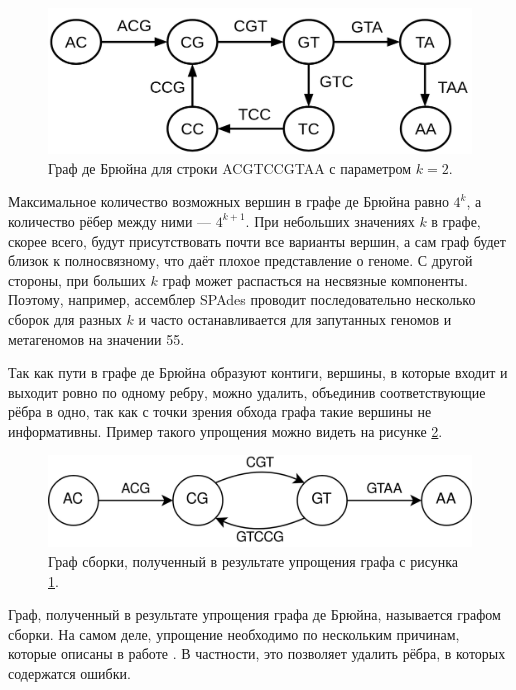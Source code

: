 \documentclass[14pt]{matmex-diploma-custom}
\begin{document}
\begin{figure}[h]
	\centering
	\includegraphics[scale=0.3]{debruijn.png}
	\caption{Граф де Брюйна для строки ACGTCCGTAA с параметром ${k=2}$.}
	\label{fig:debruijn}
\end{figure}

Максимальное количество возможных вершин в графе де Брюйна равно $4^k$, а количество рёбер между ними --- $4^{k+1}$. При небольших значениях $k$ в графе, скорее всего, будут присутствовать почти все варианты вершин, а сам граф будет близок к полносвязному, что даёт плохое представление о геноме. С другой стороны, при больших $k$ граф может распасться на несвязные компоненты. Поэтому, например, ассемблер SPAdes проводит последовательно несколько сборок для разных $k$ и часто останавливается для запутанных геномов и метагеномов на значении 55.

Так как пути в графе де Брюйна образуют контиги, вершины, в которые входит и выходит ровно по одному ребру, можно удалить, объединив соответствующие рёбра в одно, так как с точки зрения обхода графа такие вершины не информативны. Пример такого упрощения можно видеть на рисунке \ref{fig:debruijn_simpl}.

\begin{figure}[h]
	\centering
	\includegraphics[scale=0.22]{debruijn_simpl.png}
	\caption{Граф сборки, полученный в результате упрощения графа с рисунка \ref{fig:debruijn}.}
	\label{fig:debruijn_simpl}
\end{figure}

Граф, полученный в результате упрощения графа де Брюйна, называется графом сборки. На самом деле, упрощение необходимо по нескольким причинам, которые описаны в работе \cite{art:disser_andrey}. В частности, это позволяет удалить рёбра, в которых содержатся ошибки.
\end{document}
